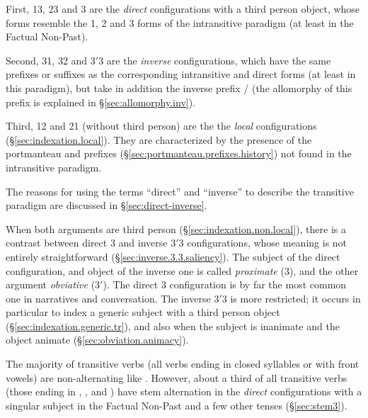 First, 1\fl{}3, 2\fl{}3 and 3\flobv{} are the \textit{direct} configurations with a third person object, whose forms resemble the 1, 2 and 3 forms of the intransitive paradigm (at least in the Factual Non-Past). 

Second, 3\fl{}1, 3\fl{}2 and 3$'$\fl{}3 are the \textit{inverse} configurations, which have the same prefixes or suffixes as the corresponding intransitive and direct forms (at least in this paradigm), but take in addition the inverse prefix / (the allomorphy of this prefix is explained in §\ref{sec:allomorphy.inv}). 

Third, 1\fl{}2 and 2\fl{}1 (without third person) are the the \textit{local} configurations (§\ref{sec:indexation.local}). They are characterized by the presence of the portmanteau  and  prefixes (§\ref{sec:portmanteau.prefixes.history}) not found in the intransitive paradigm.

The reasons for using the terms ``direct'' and ``inverse'' to describe the transitive paradigm are discussed in §\ref{sec:direct-inverse}.

When both arguments are third person (§\ref{sec:indexation.non.local}), there is a contrast between direct  3\flobv{} and inverse 3$'$\fl{}3 configurations, whose meaning is not entirely straightforward  (§\ref{sec:inverse.3.3.saliency}). The subject of the direct configuration, and object of the inverse one is called \textit{proximate} (3), and the other argument \textit{obviative} (3$'$). The direct 3\flobv{} configuration is by far the most common one in narratives and conversation. The inverse 3$'$\fl{}3 is more restricted; it occurs in particular to index a generic subject with a third person object (§\ref{sec:indexation.generic.tr}), and also when the subject is inanimate and the object animate (§\ref{sec:obviation.animacy}).

The majority of transitive verbs (all verbs ending in closed syllables or with front vowels) are non-alternating like . However, about a third of all transitive verbs (those ending in , ,  and ) have stem alternation in the \textit{direct} configurations with a singular subject in the Factual Non-Past and a few other tenses (§\ref{sec:stem3}).
 
